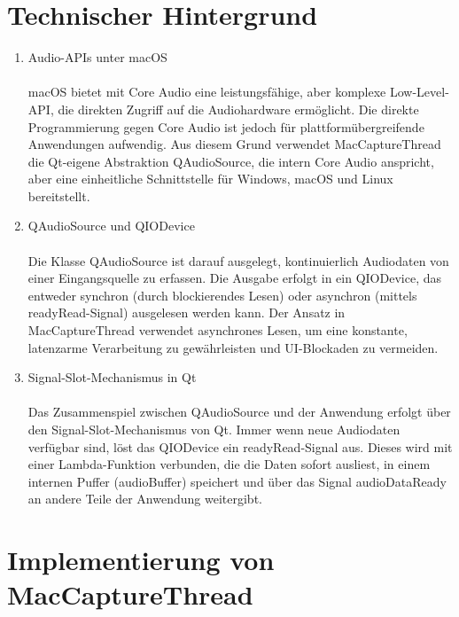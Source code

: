 %
%
\section{Technischer Hintergrund}
\label{sec:chapter03:listen}

\begin{enumerate}
 \item Audio-APIs unter macOS \\\\
 macOS bietet mit Core Audio eine leistungsfähige, aber komplexe Low-Level-API, die direkten Zugriff auf die Audiohardware ermöglicht.
Die direkte Programmierung gegen Core Audio ist jedoch für plattformübergreifende Anwendungen aufwendig. Aus diesem Grund verwendet MacCaptureThread die Qt-eigene Abstraktion QAudioSource, die intern Core Audio anspricht, aber eine einheitliche Schnittstelle für Windows, macOS und Linux bereitstellt. \cite{appleCoreAudio}

 \item QAudioSource und QIODevice \\\\
 Die Klasse QAudioSource ist darauf ausgelegt, kontinuierlich Audiodaten von einer Eingangsquelle zu erfassen. Die Ausgabe erfolgt in ein QIODevice, das entweder synchron (durch blockierendes Lesen) oder asynchron (mittels readyRead-Signal) ausgelesen werden kann.
Der Ansatz in MacCaptureThread verwendet asynchrones Lesen, um eine konstante, latenzarme Verarbeitung zu gewährleisten und UI-Blockaden zu vermeiden. \cite{qtQAudioSource}

 
 \item Signal-Slot-Mechanismus in Qt \\\\
 Das Zusammenspiel zwischen QAudioSource und der Anwendung erfolgt über den Signal-Slot-Mechanismus von Qt. Immer wenn neue Audiodaten verfügbar sind, löst das QIODevice ein readyRead-Signal aus. Dieses wird mit einer Lambda-Funktion verbunden, die die Daten sofort ausliest, in einem internen Puffer (audioBuffer) speichert und über das Signal audioDataReady an andere Teile der Anwendung weitergibt.
\cite{qtQAudioSource}

\end{enumerate}

\section{Implementierung von MacCaptureThread}


